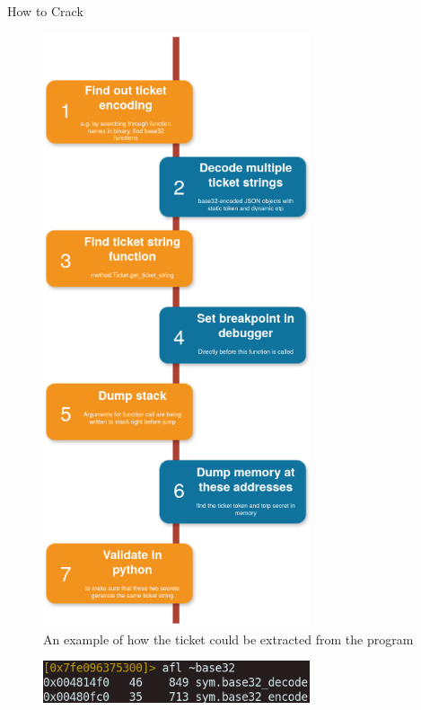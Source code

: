 \documentclass[final,dvipsnames]{beamer}
\newlength{\colwidth}
\begin{document}
\begin{frame}[t, fragile]
\begin{columns}[t]
\begin{column}{\colwidth}
    \begin{block}{How to Crack}
        \begin{figure}[h]
            \centering
            \includegraphics[width=0.7\textwidth]{figures/HackingFlow.png}
            \caption{An example of how the ticket could be extracted from the program}
            \label{fig:HackingFlow}
        \end{figure}
        \begin{figure}[h]
            \centering
            \includegraphics[width=0.7\textwidth]{figures/Hacking_step_1.png}

\end{figure}
\end{block}
\end{column}
\end{columns}
\end{frame}
\end{document}
